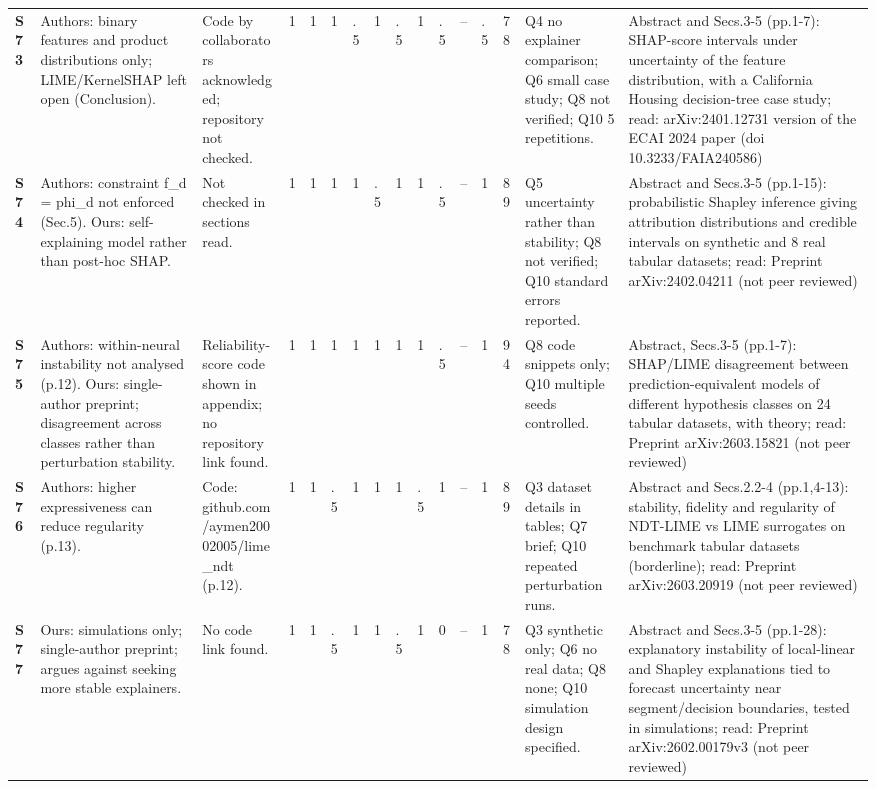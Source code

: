 \begin{longtable}{@{}P{1.0cm}P{4.6cm}P{3.6cm}P{0.3cm}P{0.3cm}P{0.3cm}P{0.3cm}P{0.3cm}P{0.3cm}P{0.3cm}P{0.3cm}P{0.3cm}P{0.36cm}P{0.75cm}P{3.0cm}P{3.9cm}@{}}
\textbf{S73} & Authors: binary features and product distributions only; LIME/\allowbreak{}KernelSHAP left open (Conclusion). & Code by collaborators acknowledged; repository not checked. & 1 & 1 & 1 & .5 & 1 & .5 & 1 & .5 & -- & .5 & 78 & Q4 no explainer comparison; Q6 small case study; Q8 not verified; Q10 5 repetitions. & Abstract and Secs.3-5 (pp.1-7): SHAP-score intervals under uncertainty of the feature distribution, with a California Housing decision-tree case study; read: arXiv:2401.12731 version of the ECAI 2024 paper (doi 10.3233/\allowbreak{}FAIA240586) \\
\textbf{S74} & Authors: constraint f\_\allowbreak{}d = phi\_\allowbreak{}d not enforced (Sec.5). Ours: self-explaining model rather than post-hoc SHAP. & Not checked in sections read. & 1 & 1 & 1 & 1 & .5 & 1 & 1 & .5 & -- & 1 & 89 & Q5 uncertainty rather than stability; Q8 not verified; Q10 standard errors reported. & Abstract and Secs.3-5 (pp.1-15): probabilistic Shapley inference giving attribution distributions and credible intervals on synthetic and 8 real tabular datasets; read: Preprint arXiv:2402.04211 (not peer reviewed) \\
\textbf{S75} & Authors: within-neural instability not analysed (p.12). Ours: single-author preprint; disagreement across classes rather than perturbation stability. & Reliability-score code shown in appendix; no repository link found. & 1 & 1 & 1 & 1 & 1 & 1 & 1 & .5 & -- & 1 & 94 & Q8 code snippets only; Q10 multiple seeds controlled. & Abstract, Secs.3-5 (pp.1-7): SHAP/\allowbreak{}LIME disagreement between prediction-equivalent models of different hypothesis classes on 24 tabular datasets, with theory; read: Preprint arXiv:2603.15821 (not peer reviewed) \\
\textbf{S76} & Authors: higher expressiveness can reduce regularity (p.13). & Code: github.com/\allowbreak{}aymen20002005/\allowbreak{}lime\_\allowbreak{}ndt (p.12). & 1 & 1 & .5 & 1 & 1 & 1 & .5 & 1 & -- & 1 & 89 & Q3 dataset details in tables; Q7 brief; Q10 repeated perturbation runs. & Abstract and Secs.2.2-4 (pp.1,4-13): stability, fidelity and regularity of NDT-LIME vs LIME surrogates on benchmark tabular datasets (borderline); read: Preprint arXiv:2603.20919 (not peer reviewed) \\
\textbf{S77} & Ours: simulations only; single-author preprint; argues against seeking more stable explainers. & No code link found. & 1 & 1 & .5 & 1 & 1 & .5 & 1 & 0 & -- & 1 & 78 & Q3 synthetic only; Q6 no real data; Q8 none; Q10 simulation design specified. & Abstract and Secs.3-5 (pp.1-28): explanatory instability of local-linear and Shapley explanations tied to forecast uncertainty near segment/\allowbreak{}decision boundaries, tested in simulations; read: Preprint arXiv:2602.00179v3 (not peer reviewed) \\

\end{longtable}
